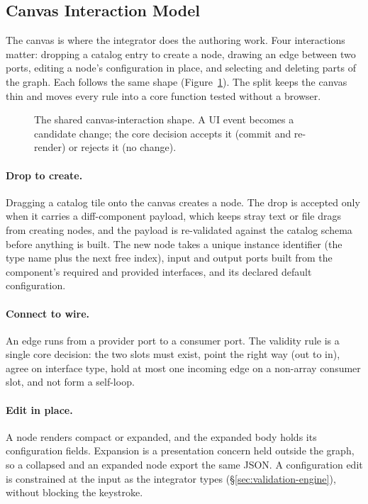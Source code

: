 \FloatBarrier

\subsection{Canvas Interaction Model}
\label{sec:canvas-model}

The canvas is where the integrator does the authoring work. Four interactions matter: dropping a catalog entry to create a node, drawing an edge between two ports, editing a node's configuration in place, and selecting and deleting parts of the graph. Each follows the same shape (Figure~\ref{fig:canvas-interaction}). The split keeps the canvas thin and moves every rule into a core function tested without a browser.

\begin{figure}[H]
    \centering
    \resizebox{0.78\textwidth}{!}{
        
    }
    \caption[The shared canvas-interaction shape.]{The shared canvas-interaction shape. A UI event becomes a candidate change; the core decision accepts it (commit and re-render) or rejects it (no change).}
    \label{fig:canvas-interaction}
\end{figure}

\paragraph{Drop to create.}
Dragging a catalog tile onto the canvas creates a node. The drop is accepted only when it carries a diff-component payload, which keeps stray text or file drags from creating nodes, and the payload is re-validated against the catalog schema before anything is built. The new node takes a unique instance identifier (the type name plus the next free index), input and output ports built from the component's required and provided interfaces, and its declared default configuration.

\paragraph{Connect to wire.}
An edge runs from a provider port to a consumer port. The validity rule is a single core decision: the two slots must exist, point the right way (out to in), agree on interface type, hold at most one incoming edge on a non-array consumer slot, and not form a self-loop.

\paragraph{Edit in place.}
A node renders compact or expanded, and the expanded body holds its configuration fields. Expansion is a presentation concern held outside the graph, so a collapsed and an expanded node export the same JSON. A configuration edit is constrained at the input as the integrator types (\S\ref{sec:validation-engine}), without blocking the keystroke.

